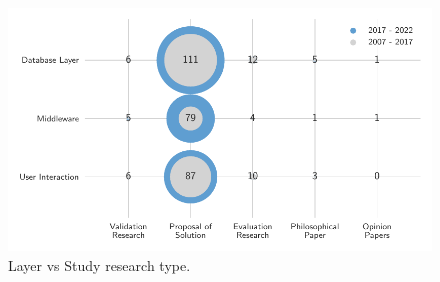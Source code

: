 \begin{figure}[hptb]
    \centering
    \includegraphics{images/3_mapping/layer_vs_type}
    \caption{ Layer vs Study research type.}
    \label{fig:mapping/layer_vs_type}
\end{figure}


